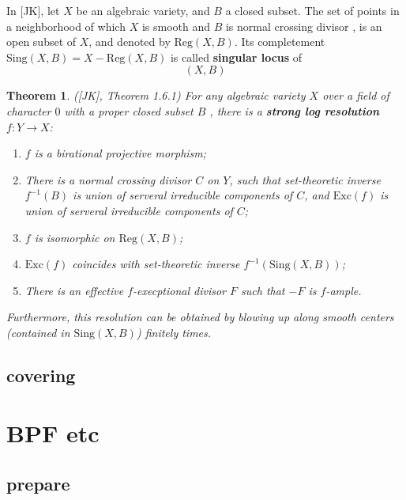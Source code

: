 \documentclass{article}
\newtheorem{thm}[defn]{Theorem}
\begin{document}
In [JK], let $ X $ be an algebraic variety, and $ B $ a closed subset. The set of points  in a neighborhood of which $ X $ is smooth and $ B $ is normal crossing divisor , is an open subset of $ X $, and denoted by $ \mathrm{Reg}(X,B) $. Its completement $ \mathrm{Sing}(X,B)=X-\mathrm{Reg}(X,B) $ is called \textbf{singular locus} of
\[
  (X,B)
\]
\begin{thm}
  ([JK], Theorem 1.6.1) For any algebraic variety $ X $ over a field of character $ 0 $ with a proper closed subset $ B $ , there is a \textbf{strong log resolution} $ f:Y\to X $:
  \begin{enumerate}
    \item $ f $ is a birational projective morphism;
    \item There is a normal crossing divisor $ C $ on $ Y $, such that set-theoretic inverse $ f^{-1}(B) $ is union of serveral irreducible components of $ C $, and $ \mathrm{Exc}(f) $ is union of serveral irreducible components of $ C $;
    \item $ f $ is isomorphic on $ \mathrm{Reg}(X,B) $;
    \item $ \mathrm{Exc}(f) $ coincides with set-theoretic inverse $ f^{-1}(\mathrm{Sing}(X,B)) $;
    \item There is  an effective  $ f $-execptional divisor $ F $ such that $ -F $ is $ f $-ample.
  \end{enumerate}
Furthermore, this resolution can be obtained by blowing up along smooth centers (contained in $ \mathrm{Sing}(X,B) $) finitely times.
\end{thm}

\subsection{covering}
\section{BPF etc}
\subsection{prepare}
\end{document}
